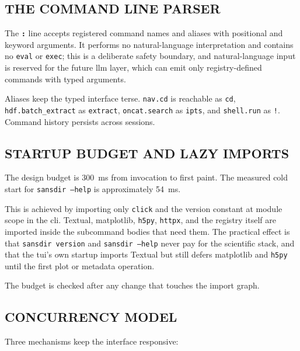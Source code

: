 \documentclass[tm]{ornltm}
\newcommand{\cmd}[1]{\texttt{#1}}
\newcommand{\key}[1]{\textbf{\texttt{#1}}}
\begin{document}
\subsection{THE COMMAND LINE PARSER}

The \key{:} line accepts registered command names and aliases with positional and
keyword arguments. It performs no natural-language interpretation and contains no
\texttt{eval} or \texttt{exec}; this is a deliberate safety boundary, and
natural-language input is reserved for the future \ac{llm} layer, which can emit
only registry-defined commands with typed arguments.

Aliases keep the typed interface terse. \cmd{nav.cd} is reachable as
\texttt{cd}, \cmd{hdf.batch\_extract} as \texttt{extract},
\cmd{oncat.search} as \texttt{ipts}, and \cmd{shell.run} as \texttt{!}.
Command history persists across sessions.

\subsection{STARTUP BUDGET AND LAZY IMPORTS}
\label{sec:startup}

The design budget is 300~ms from invocation to first paint. The measured cold
start for \texttt{sansdir --help} is approximately 54~ms.

This is achieved by importing only \texttt{click} and the version constant at
module scope in the \ac{cli}. Textual, matplotlib, \texttt{h5py}, \texttt{httpx},
and the registry itself are imported inside the subcommand bodies that need them.
The practical effect is that \texttt{sansdir version} and \texttt{sansdir --help}
never pay for the scientific stack, and that the \ac{tui}'s own startup imports
Textual but still defers matplotlib and \texttt{h5py} until the first plot or
metadata operation.

The budget is checked after any change that touches the import graph.

\subsection{CONCURRENCY MODEL}

Three mechanisms keep the interface responsive:
\end{document}
